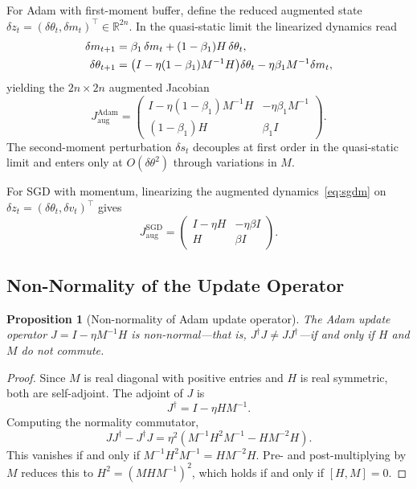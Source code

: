 \documentclass[aps,prresearch,twocolumn,superscriptaddress,longbibliography]{revtex4-2}
\newtheorem{proposition}{Proposition}
\newcommand{\R}{\mathbb{R}}
\begin{document}
For Adam with first-moment buffer, define the reduced augmented state
$\delta z_t = (\delta\theta_t, \delta m_t)^\top\in\R^{2n}$.
In the quasi-static limit the linearized dynamics read
\begin{align}
\delta m_{t+1} &= \beta_1\,\delta m_t + (1-\beta_1) H\,\delta\theta_t,
\notag\\
\delta\theta_{t+1} &= \bigl(I - \eta(1-\beta_1)M^{-1}H\bigr)\delta\theta_t
                    - \eta\beta_1 M^{-1}\delta m_t,
\notag
\end{align}
yielding the $2n\times 2n$ augmented Jacobian
\begin{equation}
J_{\mathrm{aug}}^{\mathrm{Adam}} =
\begin{pmatrix}
  I - \eta(1-\beta_1)M^{-1}H & -\eta\beta_1 M^{-1}\\
  (1-\beta_1)H                & \beta_1 I
\end{pmatrix}.
\label{eq:jacobian_adam_aug}
\end{equation}
The second-moment perturbation $\delta s_t$ decouples at first order in
the quasi-static limit and enters only at $O(\delta\theta^2)$ through
variations in $M$.

For SGD with momentum, linearizing the augmented dynamics~\eqref{eq:sgdm}
on $\delta z_t = (\delta\theta_t, \delta v_t)^\top$ gives
\begin{equation}
J_{\mathrm{aug}}^{\mathrm{SGD}} =
\begin{pmatrix}
  I - \eta H & -\eta\beta I\\
  H          & \beta I
\end{pmatrix}.
\label{eq:jacobian_sgdm}
\end{equation}

\subsection{Non-Normality of the Update Operator}

\begin{proposition}[Non-normality of Adam update operator]
\label{prop:nonnormal}
The Adam update operator $J = I - \eta M^{-1}H$ is non-normal---that
is, $J^\dagger J \neq JJ^\dagger$---if and only if $H$ and $M$ do not
commute.
\end{proposition}

\begin{proof}
Since $M$ is real diagonal with positive entries and $H$ is real
symmetric, both are self-adjoint.
The adjoint of $J$ is
\begin{equation}
J^\dagger = I - \eta H M^{-1}.
\label{eq:jadj}
\end{equation}
Computing the normality commutator,
\begin{equation}
JJ^\dagger - J^\dagger J
  = \eta^2\!\left(M^{-1}H^2M^{-1} - HM^{-2}H\right).
\label{eq:comm}
\end{equation}
This vanishes if and only if $M^{-1}H^2M^{-1} = HM^{-2}H$.
Pre- and post-multiplying by $M$ reduces this to
$H^2 = (MHM^{-1})^2$, which holds if and only if $[H,M] = 0$.
\end{proof}
\end{document}
